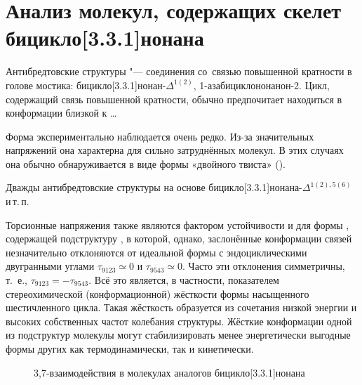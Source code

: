 \section{Анализ молекул, содержащих скелет бицикло[3.3.1]нонана}

Антибредтовские структуры "--- соединения со~связью повышенной кратности в голове мостика: бицикло[3.3.1]нонан-$\Delta^{1(2)}$, 1-азабицикло\-[3.3.1]нонанон-2. Цикл, содержащий связь повышенной кратности, обычно предпочитает находиться в конформации близкой к \dots

\begin{center}
   \quad
   \quad 
\end{center}


Форма \BB{} экспериментально наблюдается очень редко. Из-за значительных напряжений она характерна для сильно затруднённых молекул. В этих случаях она обычно обнаруживается в виде формы «двойного твиста» (\TT{}).

Дважды антибредтовские структуры на основе бицикло[3.3.1]нонана-$\Delta^{1(2),5(6)}$  и\,т.\,п.

\begin{center}
   \quad
   \quad {}
\end{center}

Торсионные напряжения также являются фактором устойчивости и для формы \CB{}, содержащей подструктуру , в которой, однако, заслонённые конформации связей незначительно отклоняются от идеальной формы  с эндоциклическими двугранными углами $\tau_{9123}\simeq 0$ и $\tau_{9543}\simeq 0$. Часто эти отклонения симметричны, т.~е., $\tau_{9123} = - \tau_{9543}$. Всё это является, в частности, показателем стереохимической (конформационной) жёсткости формы  насыщенного шестичленного цикла. Такая жёсткость образуется из сочетания низкой энергии и высоких собственных частот колебания структуры. Жёсткие конформации одной из подструктур молекулы могут стабилизировать менее энергетически выгодные формы других как термодинамически, так и кинетически.

\begin{figure}
\caption{3,7-взаимодействия в молекулах аналогов бицикло[3.3.1]нонана\label{fig:Interactions:37}}
\centerfloat{}
\end{figure}

